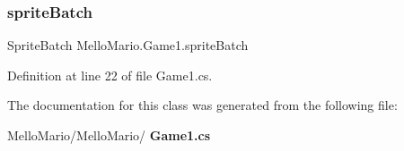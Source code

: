 \subsubsection{sprite\+Batch}
{\footnotesize\ttfamily Sprite\+Batch Mello\+Mario.\+Game1.\+sprite\+Batch\hspace{0.3cm}{\ttfamily [private]}}



Definition at line 22 of file Game1.\+cs.



The documentation for this class was generated from the following file\+:\begin{DoxyCompactItemize}
\item 
Mello\+Mario/\+Mello\+Mario/\textbf{ Game1.\+cs}\end{DoxyCompactItemize}
